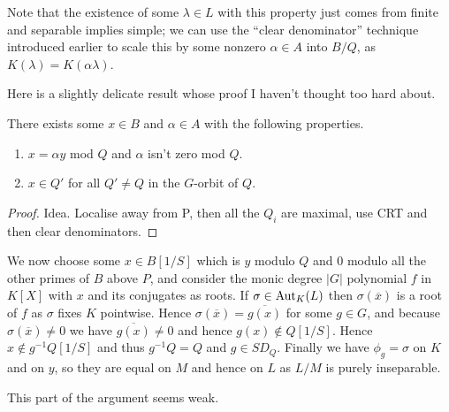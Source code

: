 Note that the existence of some $\lambda\in L$ with this property just comes from finite
and separable implies simple; we can use the ``clear denominator'' technique introduced
earlier to scale this by some nonzero $\alpha\in A$ into $B/Q$, as
$K(\lambda)=K(\alpha\lambda)$.

Here is a slightly delicate result whose proof I haven't thought too hard about.
\begin{theorem} There exists some $x\in B$ and $\alpha\in A$ with the following
  properties.
  \begin{enumerate}
  \item $x=\alpha y$ mod $Q$ and $\alpha$ isn't zero mod $Q$.
  \item $x\in Q'$ for all $Q'\not=Q$ in the $G$-orbit of $Q$.
  \end{enumerate}
\end{theorem}
\begin{proof}
  Idea. Localise away from P, then all the $Q_i$ are maximal, use CRT and then clear denominators.
\end{proof}

We now choose some $x\in B[1/S]$ which is $y$ modulo $Q$ and $0$ modulo all the other
primes of $B$ above $P$, and consider the monic degree $|G|$ polynomial $f$ in $K[X]$
with $x$ and its conjugates as roots. If $\sigma\in\operatorname{Aut}_K(L)$ then $\sigma(\overline{x})$
is a root of $f$ as $\sigma$ fixes $K$ pointwise. Hence $\sigma(\overline{x})=\overline{g(x)}$
for some $g\in G$, and because $\sigma(\overline{x})\not=0$ we have $\overline{g(x)}\not=0$
and hence $g(x)\notin Q[1/S]$. Hence $x\notin g^{-1} Q[1/S]$ and thus $g^{-1}Q=Q$ and $g\in SD_Q$.
Finally we have $\phi_g=\sigma$ on $K$ and on $y$, so they are equal on $M$ and hence on $L$ as
$L/M$ is purely inseparable.

This part of the argument seems weak.
